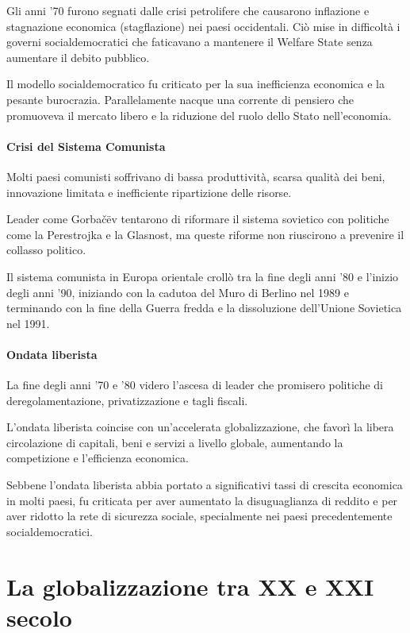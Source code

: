 \documentclass{article}
\begin{document}
Gli anni '70 furono segnati dalle crisi petrolifere che causarono inflazione e stagnazione
economica (stagflazione) nei paesi occidentali. Ciò mise in difficoltà i governi
socialdemocratici che faticavano a mantenere il Welfare State senza aumentare il debito pubblico.

Il modello socialdemocratico fu criticato per la sua inefficienza economica e la pesante
burocrazia. Parallelamente nacque una corrente di pensiero che promuoveva il mercato libero e
la riduzione del ruolo dello Stato nell'economia.

\paragraph*{Crisi del Sistema Comunista} \phantom{}

Molti paesi comunisti soffrivano di bassa produttività, scarsa qualità dei beni, innovazione
limitata e inefficiente ripartizione delle risorse.

Leader come Gorbačëv tentarono di riformare il sistema sovietico con politiche come la 
Perestrojka e la Glasnost, ma queste riforme non riuscirono a prevenire il collasso politico.

Il sistema comunista in Europa orientale crollò tra la fine degli anni '80 e l'inizio degli
anni '90, iniziando con la cadutoa del Muro di Berlino nel 1989 e terminando con la fine
della Guerra fredda e la dissoluzione dell'Unione Sovietica nel 1991.

\paragraph*{Ondata liberista} \phantom{}

La fine degli anni '70 e '80 videro l'ascesa di leader che promisero politiche di
deregolamentazione, privatizzazione e tagli fiscali.

L'ondata liberista coincise con un'accelerata globalizzazione, che favorì la libera circolazione
di capitali, beni e servizi a livello globale, aumentando la competizione e l'efficienza 
economica.

Sebbene l'ondata liberista abbia portato a significativi tassi di crescita economica in molti 
paesi, fu criticata per aver aumentato la disuguaglianza di reddito e per aver ridotto la rete
di sicurezza sociale, specialmente nei paesi precedentemente socialdemocratici.
\pagebreak

\section{La globalizzazione tra XX e XXI secolo}
\end{document}
